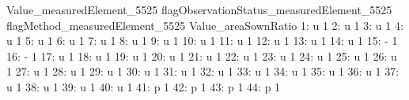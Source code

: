 \documentclass[nojss]{jss}
\begin{document}
\begin{Schunk}
\begin{Soutput}
     Value_measuredElement_5525 flagObservationStatus_measuredElement_5525
     flagMethod_measuredElement_5525 Value_areaSownRatio
  1:                               u                   1
  2:                               u                   1
  3:                               u                   1
  4:                               u                   1
  5:                               u                   1
  6:                               u                   1
  7:                               u                   1
  8:                               u                   1
  9:                               u                   1
 10:                               u                   1
 11:                               u                   1
 12:                               u                   1
 13:                               u                   1
 14:                               u                   1
 15:                               -                   1
 16:                               -                   1
 17:                               u                   1
 18:                               u                   1
 19:                               u                   1
 20:                               u                   1
 21:                               u                   1
 22:                               u                   1
 23:                               u                   1
 24:                               u                   1
 25:                               u                   1
 26:                               u                   1
 27:                               u                   1
 28:                               u                   1
 29:                               u                   1
 30:                               u                   1
 31:                               u                   1
 32:                               u                   1
 33:                               u                   1
 34:                               u                   1
 35:                               u                   1
 36:                               u                   1
 37:                               u                   1
 38:                               u                   1
 39:                               u                   1
 40:                               u                   1
 41:                               p                   1
 42:                               p                   1
 43:                               p                   1
 44:                               p                   1

\end{Soutput}
\end{Schunk}
\end{document}
